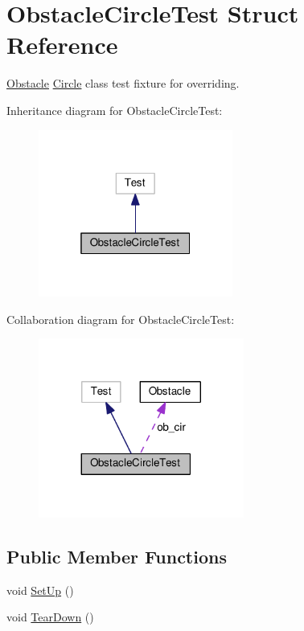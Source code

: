 \hypertarget{structObstacleCircleTest}{}\section{Obstacle\+Circle\+Test Struct Reference}
\label{structObstacleCircleTest}


\hyperlink{classObstacle}{Obstacle} \hyperlink{classCircle}{Circle} class test fixture for overriding.  




Inheritance diagram for Obstacle\+Circle\+Test\+:
\nopagebreak
\begin{figure}[H]
\begin{center}
\leavevmode
\includegraphics[width=181pt]{structObstacleCircleTest__inherit__graph}
\end{center}
\end{figure}


Collaboration diagram for Obstacle\+Circle\+Test\+:
\nopagebreak
\begin{figure}[H]
\begin{center}
\leavevmode
\includegraphics[width=191pt]{structObstacleCircleTest__coll__graph}
\end{center}
\end{figure}
\subsection*{Public Member Functions}
\begin{DoxyCompactItemize}
\item 
void \hyperlink{structObstacleCircleTest_a3f4cb1b05f4b820fb6042bd9278c516d}{Set\+Up} ()
\item 
void \hyperlink{structObstacleCircleTest_a994997c94bc7e1abc8055924051bcad6}{Tear\+Down} ()
\end{DoxyCompactItemize}
